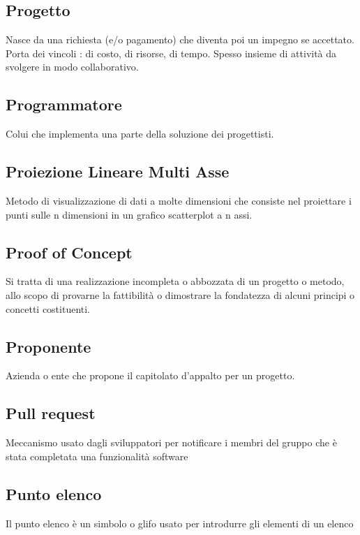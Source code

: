 \documentclass[../glossario.tex]{subfiles}
\begin{document}
\subsection*{Progetto}
{}
Nasce da una richiesta (e/o pagamento) che diventa poi un impegno se accettato. Porta dei vincoli : di costo, di risorse, di tempo. Spesso insieme di attività da svolgere in modo collaborativo.

\subsection*{Programmatore}
{}
Colui che implementa una parte della soluzione dei progettisti.

\subsection*{Proiezione Lineare Multi Asse}
{}
Metodo di visualizzazione di dati a molte dimensioni che consiste nel proiettare i punti sulle n dimensioni in un grafico scatterplot a n assi.

\subsection*{Proof of Concept}
{}
Si tratta di una realizzazione incompleta o abbozzata di un progetto o metodo, allo scopo di provarne la fattibilità o dimostrare la fondatezza di alcuni principi o concetti costituenti.

\subsection*{Proponente}
{}
Azienda o ente che propone il capitolato d'appalto per un progetto.

\subsection*{Pull request}
{}
Meccanismo usato dagli sviluppatori per notificare i membri del gruppo che è stata completata una funzionalità software

\subsection*{Punto elenco}
{}
Il punto elenco è un simbolo o glifo usato per introdurre gli elementi di un elenco
\end{document}
